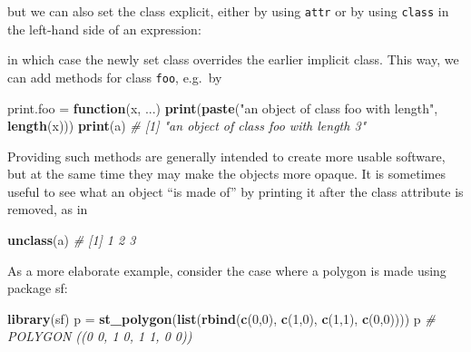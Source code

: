\documentclass[]{book}
\newenvironment{Shaded}{\begin{snugshade}}{\end{snugshade}}
\newcommand{\CommentTok}[1]{\textcolor[rgb]{0.56,0.35,0.01}{\textit{#1}}}
\newcommand{\ControlFlowTok}[1]{\textcolor[rgb]{0.13,0.29,0.53}{\textbf{#1}}}
\newcommand{\DecValTok}[1]{\textcolor[rgb]{0.00,0.00,0.81}{#1}}
\newcommand{\KeywordTok}[1]{\textcolor[rgb]{0.13,0.29,0.53}{\textbf{#1}}}
\newcommand{\NormalTok}[1]{#1}
\newcommand{\OperatorTok}[1]{\textcolor[rgb]{0.81,0.36,0.00}{\textbf{#1}}}
\newcommand{\StringTok}[1]{\textcolor[rgb]{0.31,0.60,0.02}{#1}}
\begin{document}
but we can also set the class explicit, either by using \texttt{attr} or by
using \texttt{class} in the left-hand side of an expression:

\begin{Shaded}
\end{Shaded}

in which case the newly set class overrides the earlier implicit class. This way,
we can add methods for class \texttt{foo}, e.g.~by

\begin{Shaded}
\begin{Highlighting}[]
\NormalTok{print.foo =}\StringTok{ }\ControlFlowTok{function}\NormalTok{(x, ...) }\KeywordTok{print}\NormalTok{(}\KeywordTok{paste}\NormalTok{(}\StringTok{"an object of class foo with length"}\NormalTok{, }\KeywordTok{length}\NormalTok{(x)))}
\KeywordTok{print}\NormalTok{(a)}
\CommentTok{# [1] "an object of class foo with length 3"}
\end{Highlighting}
\end{Shaded}

Providing such methods are generally intended to create more usable
software, but at the same time they may make the objects more opaque. It is
sometimes useful to see what an object ``is made of'' by printing it after the
class attribute is removed, as in

\begin{Shaded}
\begin{Highlighting}[]
\KeywordTok{unclass}\NormalTok{(a)}
\CommentTok{# [1] 1 2 3}
\end{Highlighting}
\end{Shaded}

As a more elaborate example, consider the case where a polygon is made using
package sf:

\begin{Shaded}
\begin{Highlighting}[]
\KeywordTok{library}\NormalTok{(sf)}
\NormalTok{p =}\StringTok{ }\KeywordTok{st_polygon}\NormalTok{(}\KeywordTok{list}\NormalTok{(}\KeywordTok{rbind}\NormalTok{(}\KeywordTok{c}\NormalTok{(}\DecValTok{0}\NormalTok{,}\DecValTok{0}\NormalTok{), }\KeywordTok{c}\NormalTok{(}\DecValTok{1}\NormalTok{,}\DecValTok{0}\NormalTok{), }\KeywordTok{c}\NormalTok{(}\DecValTok{1}\NormalTok{,}\DecValTok{1}\NormalTok{), }\KeywordTok{c}\NormalTok{(}\DecValTok{0}\NormalTok{,}\DecValTok{0}\NormalTok{))))}
\NormalTok{p}
\CommentTok{# POLYGON ((0 0, 1 0, 1 1, 0 0))}
\end{Highlighting}
\end{Shaded}
\end{document}
